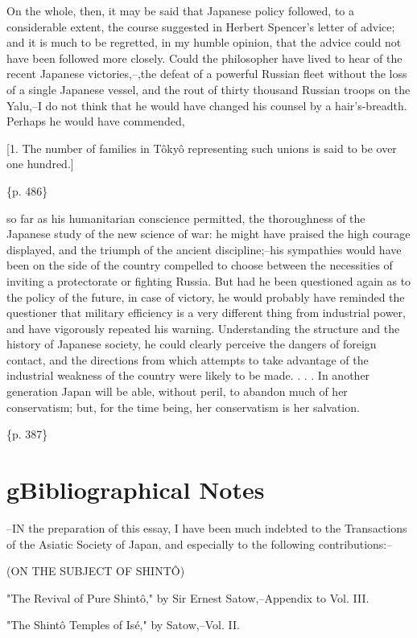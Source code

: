 On the whole, then, it may be said that Japanese policy followed, to a considerable extent, the course suggested in Herbert Spencer's letter of advice; and it is much to be regretted, in my humble opinion, that the advice could not have been followed more closely. Could the philosopher have lived to hear of the recent Japanese victories,--,the defeat of a powerful Russian fleet without the loss of a single Japanese vessel, and the rout of thirty thousand Russian troops on the Yalu,--I do not think that he would have changed his counsel by a hair's-breadth. Perhaps he would have commended,

[1. The number of families in Tôkyô representing such unions is said to be over one hundred.]

\{p. 486\}

so far as his humanitarian conscience permitted, the thoroughness of the Japanese study of the new science of war: he might have praised the high courage displayed, and the triumph of the ancient discipline;--his sympathies would have been on the side of the country compelled to choose between the necessities of inviting a protectorate or fighting Russia. But had he been questioned again as to the policy of the future, in case of victory, he would probably have reminded the questioner that military efficiency is a very different thing from industrial power, and have vigorously repeated his warning. Understanding the structure and the history of Japanese society, he could clearly perceive the dangers of foreign contact, and the directions from which attempts to take advantage of the industrial weakness of the country were likely to be made. . . . In another generation Japan will be able, without peril, to abandon much of her conservatism; but, for the time being, her conservatism is her salvation.

\{p. 387\}

\section{gBibliographical Notes}
\label{sec:org3373e62}

--IN the preparation of this essay, I have been much indebted to the Transactions of the Asiatic Society of Japan, and especially to the following contributions:--

(ON THE SUBJECT OF SHINTÔ)

"The Revival of Pure Shintô," by Sir Ernest Satow,--Appendix to Vol. III.

"The Shintô Temples of Isé," by Satow,--Vol. II.

